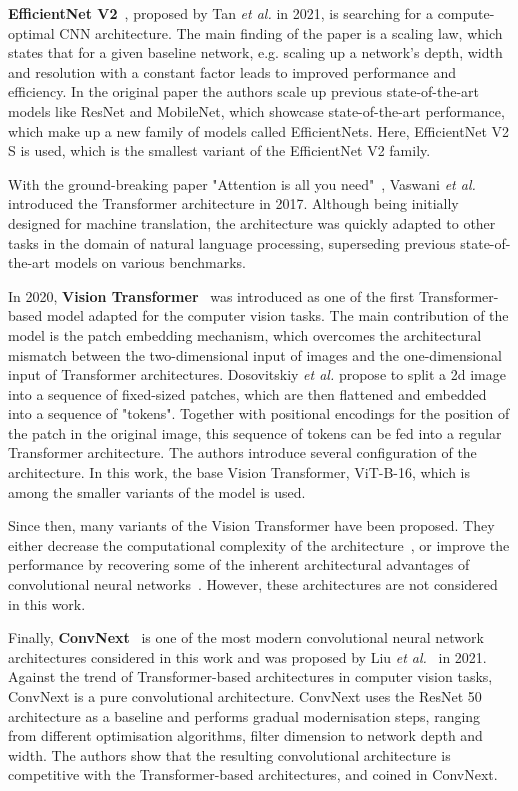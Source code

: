 \documentclass[a4paper]{article}
\begin{document}
\textbf{EfficientNet V2}~\cite{efficientnetv2}, proposed by Tan \textit{et al.}
in 2021, is searching for a compute-optimal CNN architecture. The main finding
of the paper is a scaling law, which states that for a given baseline network,
e.g. scaling up a network's depth, width and resolution with a constant factor
leads to improved performance and efficiency. In the original paper the authors
scale up previous state-of-the-art models like ResNet and MobileNet, which
showcase state-of-the-art performance, which make up a new family of models
called EfficientNets. Here, EfficientNet V2 S is used, which is the smallest
variant of the EfficientNet V2 family.

With the ground-breaking paper "Attention is all you need"~\cite{transformer},
Vaswani \textit{et al.} introduced the Transformer architecture in 2017.
Although being initially designed for machine translation, the architecture was
quickly adapted to other tasks in the domain of natural language processing,
superseding previous state-of-the-art models on various benchmarks. 

In 2020, \textbf{Vision Transformer}~\cite{vit} was introduced as one of the
first Transformer-based model adapted for the computer vision tasks. The main
contribution of the model is the patch embedding mechanism, which overcomes the
architectural mismatch between the two-dimensional input of images and the
one-dimensional input of Transformer architectures. Dosovitskiy \textit{et al.}
propose to split a 2d image into a sequence of fixed-sized patches, which are
then flattened and embedded into a sequence of "tokens". Together with
positional encodings for the position of the patch in the original image, this
sequence of tokens can be fed into a regular Transformer architecture. The
authors introduce several configuration of the architecture. In this work, the
base Vision Transformer, ViT-B-16, which is among the smaller variants of the
model is used.

Since then, many variants of the Vision Transformer have been proposed. They
either decrease the computational complexity of the architecture~\cite{deit,
vitlite}, or improve the performance by recovering some of the inherent
architectural advantages of convolutional neural networks~\cite{swin}. However,
these architectures are not considered in this work.

Finally, \textbf{ConvNext}~\cite{convnext} is one of the most modern
convolutional neural network architectures considered in this work and was
proposed by Liu \textit{et al.}~\cite{convnext} in 2021. Against the trend of
Transformer-based architectures in computer vision tasks, ConvNext is a pure
convolutional architecture. ConvNext uses the ResNet 50~\cite{resnet}
architecture as a baseline and performs gradual modernisation steps, ranging
from different optimisation algorithms, filter dimension to network depth and
width. The authors show that the resulting convolutional architecture is
competitive with the Transformer-based architectures, and coined in ConvNext.
\end{document}
